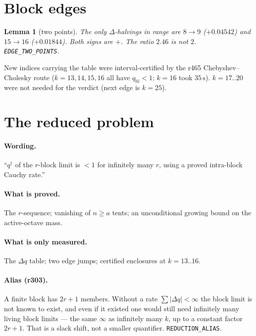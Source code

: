 \documentclass[11pt]{article}
\newtheorem{lemma}{Lemma}
\begin{document}
\section{Block edges}\label{sec:B}

\begin{lemma}[two points]\label{lem:edge}
The only $\Delta$-halvings in range are
$8\to9$ ($+0.04542$) and $15\to16$ ($+0.01844$).
Both signs are $+$.
The ratio $2.46$ is not $2$.
\texttt{EDGE\_TWO\_POINTS}.
\end{lemma}

New indices carrying the table were interval-certified
by the r465 Chebyshev--Cholesky route
($k=13,14,15,16$ all have $q_{\mathrm{hi}}<1$;
$k=16$ took $35\,\mathrm{s}$).
$k=17..20$ were not needed for the verdict
(next edge is $k=25$).

\section{The reduced problem}\label{sec:C}

\paragraph{Wording.}
``$q^{\dagger}$ of the $r$-block limit is $<1$ for
infinitely many $r$, using a proved intra-block
Cauchy rate.''

\paragraph{What is proved.}
The $r$-sequence; vanishing of $n\ge a$ tents;
an unconditional growing bound on the active-octave
mass.

\paragraph{What is only measured.}
The $\Delta q$ table; two edge jumps; certified
enclosures at $k=13..16$.

\paragraph{Alias (r303).}
A finite block has $2r+1$ members.
Without a rate $\sum|\Delta q|<\infty$ the block
limit is not known to exist, and even if it existed
one would still need infinitely many living block
limits --- the same $\infty$ as infinitely many $k$,
up to a constant factor $2r+1$.
That is a slack shift, not a smaller quantifier.
\texttt{REDUCTION\_ALIAS}.
\end{document}
